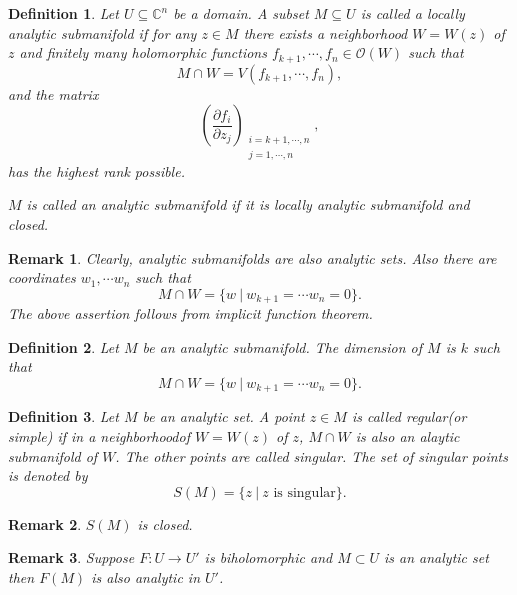 \documentclass{article}
\newtheorem{definition}{Definition}[section]
\newtheorem{remark}{Remark}[section]
\newcommand{\C}[0]{\mathbb{C}}
\newcommand{\sep}[0]{\:|\:}
\newcommand{\pd}[2]{{\frac {\partial#1} {\partial#2}}}
\begin{document}
\begin{definition}
  Let $U\subseteq\C^n$ be a domain. A subset $M\subseteq U$ is called a locally analytic submanifold if for any $z\in M$ there exists a neighborhood $W=W(z)$ of $z$ and finitely many holomorphic functions $f_{k+1},\cdots,f_n\in\mathcal{O}(W)$ such that 
  \begin{equation*}
    M\cap W = V(f_{k+1},\cdots,f_n),
  \end{equation*}
  and the matrix
  \begin{equation*}
    \left(\pd{f_i}{z_j}\right)_{\substack{i=k+1,\cdots,n\\ j=1,\cdots,n}},
  \end{equation*}
  has the highest rank possible. 
  \par $M$ is called an analytic submanifold if it is locally analytic submanifold and closed.
\end{definition}

\begin{remark}
  Clearly, analytic submanifolds are also analytic sets. Also there are coordinates $w_1,\cdots w_n$ such that 
  \begin{equation*}
    M\cap W=\{w\sep w_{k+1}=\cdots w_n=0\}.
  \end{equation*}
  The above assertion follows from implicit function theorem.
\end{remark}

\begin{definition}
  Let $M$ be an analytic submanifold. The dimension of $M$ is $k$ such that 
  \begin{equation*}
    M\cap W=\{w\sep w_{k+1}=\cdots w_n=0\}.
  \end{equation*}
\end{definition}

\begin{definition}
  Let $M$ be an analytic set. A point $z\in M$ is called regular(or simple) if in a neighborhoodof $W=W(z)$ of $z$, $M\cap W$ is also an alaytic submanifold of $W$. The other points are called singular. The set of singular points is denoted by 
  \begin{equation*}
    S(M) = \{z\sep z\text{ is singular}\}.
  \end{equation*}
\end{definition}

\begin{remark}
  $S(M)$ is closed.
\end{remark}

\begin{remark}
  Suppose $F:U\to U'$ is biholomorphic and $M\subset U$ is an analytic set then $F(M)$ is also analytic in $U'$.
\end{remark}
\end{document}
